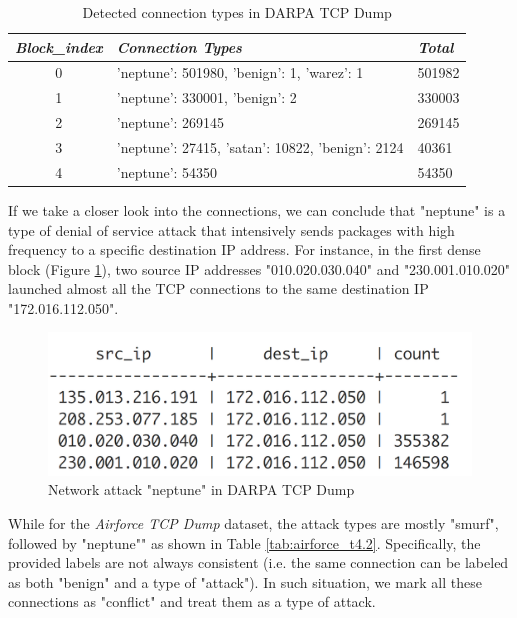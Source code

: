 \renewcommand{\arraystretch}{1.2}
\begin{table}[!ht]
\centering
\caption{Detected connection types in DARPA TCP Dump}
\label{tab:darpa_t4.2}
\begin{tabular}{|c|p{9cm}|p{2cm}|}
\hline
\textit{\textbf{Block\_index}} & \textit{\textbf{Connection Types}}  & \textit{\textbf{Total}} \\ \hline
{0}    & {'neptune': 501980, 'benign': 1, 'warez': 1}    & 501982                \\ \hline
{1}    & {'neptune': 330001, 'benign': 2}                & 330003               \\ \hline
{2}    & {'neptune': 269145}                 & 269145                           \\ \hline
{3}    & {'neptune': 27415, 'satan': 10822, 'benign': 2124}         & 40361     \\ \hline
{4}    & {'neptune': 54350}               & 54350                                \\ \hline
\end{tabular}
\end{table}

If we take a closer look into the connections, we can conclude that "neptune" is a type of denial of service attack that intensively sends packages with high frequency to a specific destination IP address. For instance, in the first dense block (Figure \ref{fig:t4_neptune}), two source IP addresses "010.020.030.040" and "230.001.010.020" launched almost all the TCP connections to the same destination IP "172.016.112.050". 

\begin{figure}[!ht]
    \centering
    \includegraphics[scale=0.45]{T4_DARPA_1stDenseBlock.png}
    \caption{Network attack "neptune" in DARPA TCP Dump}
    \label{fig:t4_neptune}
\end{figure}


While for the \textit{Airforce TCP Dump} dataset, the attack types are mostly "smurf", followed by "neptune"" as shown in Table \ref{tab:airforce_t4.2}. Specifically, the provided labels are not always consistent (i.e. the same connection can be labeled as both "benign" and a type of "attack"). In such situation, we mark all these connections as "conflict" and treat them as a type of attack.

